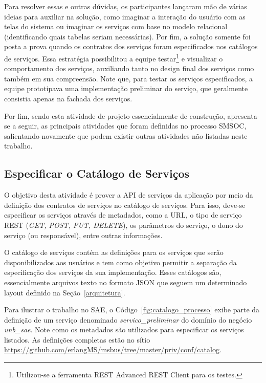 Para resolver essas e outras dúvidas,
os participantes lançaram mão de várias ideias para auxiliar
na solução,
como imaginar a interação do usuário com 
as telas do sistema ou
imaginar os serviços com base no modelo
relacional (identificando quais tabelas seriam necessárias).
Por fim, a solução somente foi posta a prova
quando os contratos dos serviços foram especificados nos catálogos de serviços. 
Essa estratégia possibilitou a equipe 
testar\footnote{Utilizou-se a ferramenta REST Advanced REST Client para os testes.} e
visualizar o comportamento dos serviços, 
auxiliando tanto
no design final dos serviços como também em sua compreensão.
Note que, para testar os serviços especificados,
a equipe prototipava uma implementação preliminar do serviço, que geralmente 
consistia apenas na fachada dos serviços.

Por fim, sendo esta atividade de projeto essencialmente de construção,
apresenta-se a seguir, as principais atividades que foram definidas 
no processo \acrshort{SMSOC}, salientando novamente que podem existir outras atividades 
não listadas neste trabalho.


\subsection{Especificar o Catálogo de Serviços}

O objetivo desta atividade 
é prover a \acrshort{API} de serviços da aplicação por meio
da definição dos contratos de serviços 
no catálogo de serviços. Para isso,
deve-se especificar os serviços
através de metadados,
como a URL,
o tipo de serviço 
REST (\textit{GET, POST, PUT, DELETE}), 
os parâmetros do serviço, 
o dono do serviço (ou responsável), 
entre outras informações. 

O catálogo de serviços contém as definições para 
os serviços 
que serão disponibilizados aos usuários 
e tem como objetivo permitir 
a separação da especificação dos serviços
da sua implementação. Esses catálogos
são, essencialmente arquivos texto 
no formato JSON que seguem um 
determinado layout definido na Seção~\ref{arquitetura}.

Para ilustrar o trabalho no \acrshort{SAE}, 
o Código~\ref{fig:catalogo_processo} 
exibe parte da definição de um serviço 
denominado \emph{servico\_preliminar} 
do domínio do negócio \emph{unb\_sae}. 
Note como os metadados são utilizados para especificar 
os serviços listados.
As definições completas 
estão no sítio \url{https://github.com/erlangMS/msbus/tree/master/priv/conf/catalog}.

